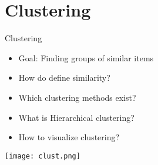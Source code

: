 \section{Clustering}
\begin{frame}
\tableofcontents[currentsection]
\end{frame}

\begin{frame}{Clustering}
  \begin{itemize}
    \item Goal: Finding groups of similar items
    \item How do define similarity?
    \item Which clustering methods exist?
    \item What is Hierarchical clustering?
    \item How to visualize clustering?
  \end{itemize}
  \begin{center}
    \texttt{[image: clust.png]}
  \end{center}
\end{frame}
